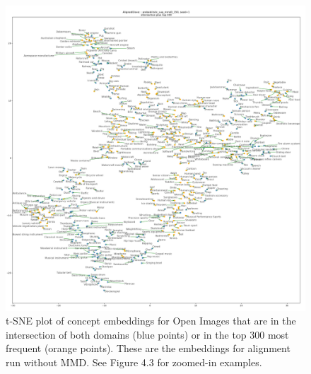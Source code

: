 \begin{figure}[H]
    \centering
    \includegraphics[width=\textwidth]{images/results/intersection_top300_tsne_openimages_probabilistic_sup_mmd0_150_AlignedGlove_1.png}
    \caption{
        t-SNE plot of concept embeddings for Open Images that are in the intersection of both domains (blue points) or in the top 300 most frequent (orange points). These are the embeddings for alignment run without MMD. See Figure 4.3 for zoomed-in examples. 
    }
\end{figure}

